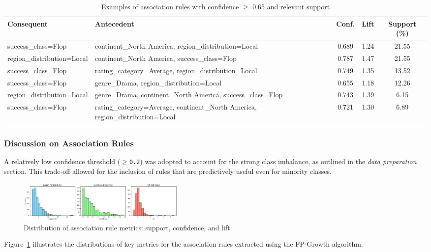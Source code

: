 \documentclass[10pt]{article}
\begin{document}
\begin{table}[H]
\centering
\label{tab:regole_flop}
\begin{tabular}{|p{4cm}|p{5.5cm}|c|c|c|}
\hline
\textbf{Consequent} & \textbf{Antecedent} & \textbf{Conf.} & \textbf{Lift} & \textbf{Support (\%)} \\
\hline
success\_class=Flop & continent\_North America, region\_distribution=Local & 0.689 & 1.24 & 21.55 \\
\hline
region\_distribution=Local & continent\_North America, success\_class=Flop & 0.787 & 1.47 & 21.55 \\
\hline
success\_class=Flop & rating\_category=Average, region\_distribution=Local & 0.749 & 1.35 & 13.52 \\
\hline
success\_class=Flop & genre\_Drama, region\_distribution=Local & 0.655 & 1.18 & 12.26 \\
\hline
region\_distribution=Local & genre\_Drama, continent\_North America, success\_class=Flop & 0.743 & 1.39 & 6.15 \\
\hline
success\_class=Flop & rating\_category=Average, continent\_North America, region\_distribution=Local & 0.721 & 1.30 & 6.89 \\
\hline
\caption{Examples of association rules with confidence $\geq$ 0.65 and relevant support}
\end{tabular}
\end{table}

\subsubsection{Discussion on Association Rules}

A relatively low confidence threshold (\texttt{$\geqslant$0.2}) was adopted to account for the strong class imbalance, as outlined in the \emph{data preparation} section. This trade-off allowed for the inclusion of rules that are predictively useful even for minority classes.

\begin{figure}[H]
\centering
\includegraphics[width=0.4\textwidth]{dist_sup_lift_conf.png}
\caption{Distribution of association rule metrics: support, confidence, and lift}
\label{fig:metriche_regole}
\end{figure}

Figure~\ref{fig:metriche_regole} illustrates the distributions of key metrics for the association rules extracted using the FP-Growth algorithm.
\end{document}

